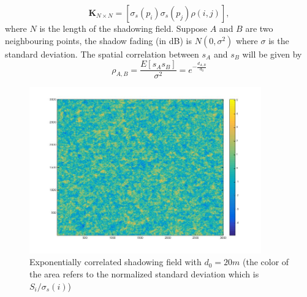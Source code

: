 \begin{equation}
\mathbf{K}_{N\times N} = [ \sigma_{s}(p_{i})\sigma_{s}(p_{j})\rho(i,j)],
\label{correlationmatrix}
\end{equation}
where $N$ is the length of the shadowing field. Suppose $A$ and $B$ are two neighbouring points, the shadow fading (in dB) is $N(0,\sigma^2)$ where $\sigma$ is the standard deviation. The spatial correlation between $s_{A}$ and $s_{B}$ will be given by 
\begin{equation}
\rho_{A,B} = \frac{E[s_{A}s_{B}]}{\sigma^2} =e^{-\frac{d_{A,B}}{d_{0}}}
\end{equation}
\begin{figure}
\centering
\includegraphics[width = 10cm]{ShadowFieldDeCorr20.jpg}
\caption{Exponentially correlated shadowing field with $d_{0} = 20m$ (the color of the area refers to the normalized standard deviation which is $S_{i}/\sigma_{s}(i)$)}

\label{ch4:shadowingfield}
\end{figure}

